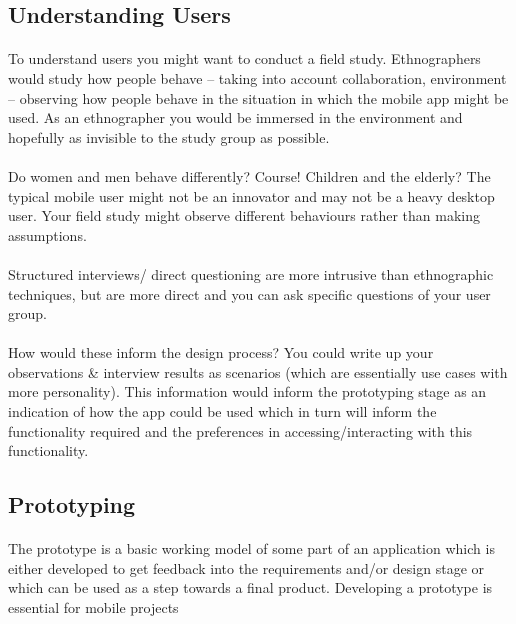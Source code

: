 \subsection{Understanding Users}
\paragraph{} To understand users you might want to conduct a field study. Ethnographers would study how people behave – taking into account collaboration, environment – observing how people behave in the situation in which the mobile app might be used. As an ethnographer you would be immersed in the environment and hopefully as invisible to the study group as possible.

\paragraph{} Do women and men behave differently? Course! Children and the elderly? The typical mobile user might not be an innovator and may not be a heavy desktop user. Your field study might observe different behaviours rather than making assumptions.

\paragraph{} Structured interviews/ direct questioning are more intrusive than ethnographic techniques, but are more direct and you can ask specific questions of your user group.

\paragraph{} How would these inform the design process? You could write up your observations \& interview results as scenarios (which are essentially use cases with more personality). This information would inform the prototyping stage as an indication of how the app could be used which in turn will inform the functionality required and the preferences in accessing/interacting with this functionality.

\subsection{Prototyping}

\paragraph{} The prototype is a basic working model of some part of an application which is either developed to get feedback into the requirements and/or design stage or which can be used as a step towards a final product. Developing a prototype is essential for mobile projects

